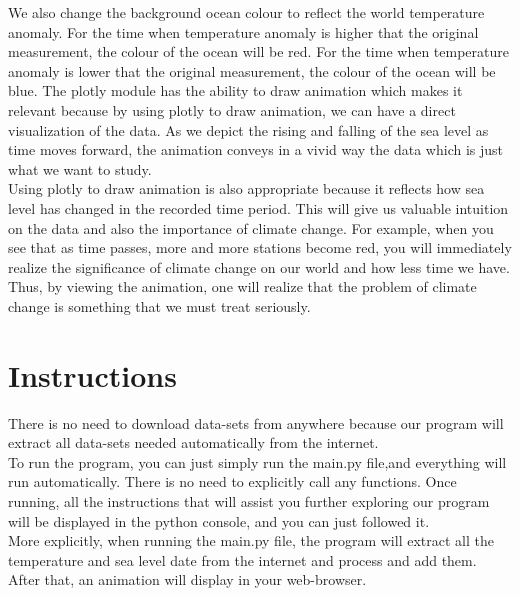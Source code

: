 \documentclass[fontsize=11pt]{article}
\begin{document}
    We also change the background ocean colour to reflect the world temperature anomaly. For the time when temperature anomaly is higher that the original measurement, the colour of the ocean will be red. 
    For the time when temperature anomaly is lower that the original measurement, the colour of the ocean will be blue.
    The plotly module has the ability to draw animation which makes it relevant because by using plotly to draw animation, we can have a direct visualization of the data. As we depict the rising and falling of the sea level as time moves forward, the animation conveys in a vivid way the data which is just what we want to study. \\
    Using plotly to draw animation is also appropriate because it reflects how sea level has changed in the recorded time period. This will give us valuable intuition on the data and also the importance of climate change. For example, when you see that as time passes, more and more stations become red, you will immediately realize the significance of climate change on our world and how less time we have. Thus, by viewing the animation, one will realize that the problem of climate change is something that we must treat seriously.

   \section*{Instructions}
   There is no need to download data-sets from anywhere because our program will extract all data-sets needed automatically from the internet. \\
   To run the program, you can just simply run the main.py file,and everything will run automatically. There is no need to explicitly call any functions. Once running, all the instructions that will assist you further exploring our program will be displayed in the python console, and you can just followed it. \\
   More explicitly, when running the main.py file, the program will extract all the temperature and sea level date from the internet and process and add them. After that, an animation will display in your web-browser. 
   
\end{document}
